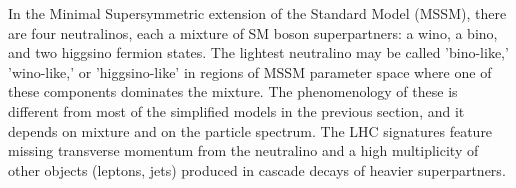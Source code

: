 In the Minimal Supersymmetric extension of the Standard Model (MSSM),
there are four neutralinos, each a mixture of SM boson superpartners: a wino, a bino, and two higgsino fermion states.
The lightest neutralino may be called 'bino-like,' 'wino-like,' or 'higgsino-like'
in regions of MSSM parameter space where one of these components dominates the mixture.
The phenomenology of these  is different from most of the simplified models in the previous section, and it depends on mixture and on the particle spectrum. 
The LHC signatures feature missing transverse momentum from the neutralino and a high multiplicity of other objects
(leptons, jets) produced in cascade decays of heavier superpartners.  



%

